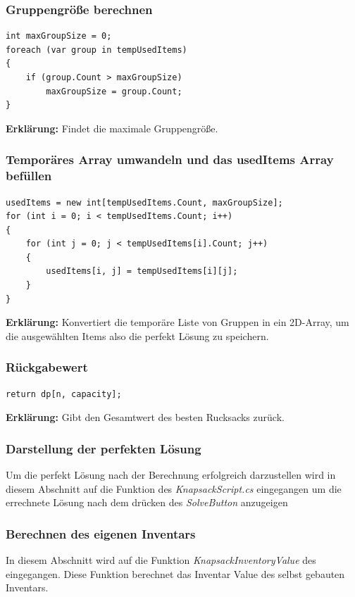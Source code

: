 \subsubsection{Gruppengröße berechnen}
\begin{lstlisting}[style=csharp, caption={}, label=code:maxgroup]
int maxGroupSize = 0;
foreach (var group in tempUsedItems)
{
    if (group.Count > maxGroupSize)
        maxGroupSize = group.Count;
}
\end{lstlisting}
\textbf{Erklärung:} Findet die maximale Gruppengröße.\\

\subsubsection{Temporäres Array umwandeln und das usedItems Array befüllen}
\begin{lstlisting}[style=csharp, caption={}, label=code:convert]
usedItems = new int[tempUsedItems.Count, maxGroupSize];
for (int i = 0; i < tempUsedItems.Count; i++)
{
    for (int j = 0; j < tempUsedItems[i].Count; j++)
    {
        usedItems[i, j] = tempUsedItems[i][j];
    }
}
\end{lstlisting}
\textbf{Erklärung:} Konvertiert die temporäre Liste von Gruppen in ein 2D-Array, um die ausgewählten Items also die perfekt Lösung zu speichern.\\

\subsubsection{Rückgabewert}
\begin{lstlisting}[style=csharp, caption={}, label=code:return]
return dp[n, capacity];
\end{lstlisting}
\textbf{Erklärung:} Gibt den Gesamtwert des besten Rucksacks zurück.\\

\subsubsection{Darstellung der perfekten Lösung}
Um die perfekt Lösung nach der Berechnung erfolgreich darzustellen wird in diesem Abschnitt auf die  Funktion des
\textit{KnapsackScript.cs} eingegangen um die errechnete Lösung nach dem drücken des \textit{SolveButton} anzugeigen

\subsubsection{Berechnen des eigenen Inventars}
In diesem Abschnitt wird auf die Funktion \textit{KnapsackInventoryValue} des  eingegangen. Diese Funktion
berechnet das Inventar Value des selbst gebauten Inventars.

